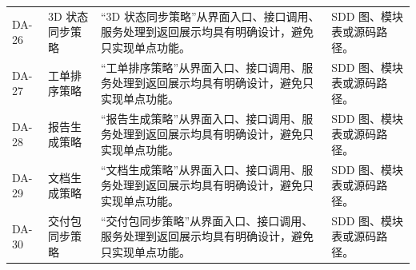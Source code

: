 \documentclass[12pt,a4paper]{ctexart}
\begin{document}
\begin{longtable}{L{1.7cm}L{4.0cm}L{6.2cm}L{3.6cm}}
DA-26 & 3D 状态同步策略 & “3D 状态同步策略”从界面入口、接口调用、服务处理到返回展示均具有明确设计，避免只实现单点功能。 & SDD 图、模块表或源码路径。 \\
DA-27 & 工单排序策略 & “工单排序策略”从界面入口、接口调用、服务处理到返回展示均具有明确设计，避免只实现单点功能。 & SDD 图、模块表或源码路径。 \\
DA-28 & 报告生成策略 & “报告生成策略”从界面入口、接口调用、服务处理到返回展示均具有明确设计，避免只实现单点功能。 & SDD 图、模块表或源码路径。 \\
DA-29 & 文档生成策略 & “文档生成策略”从界面入口、接口调用、服务处理到返回展示均具有明确设计，避免只实现单点功能。 & SDD 图、模块表或源码路径。 \\
DA-30 & 交付包同步策略 & “交付包同步策略”从界面入口、接口调用、服务处理到返回展示均具有明确设计，避免只实现单点功能。 & SDD 图、模块表或源码路径。 \\
\bottomrule
\end{longtable}
\end{document}
